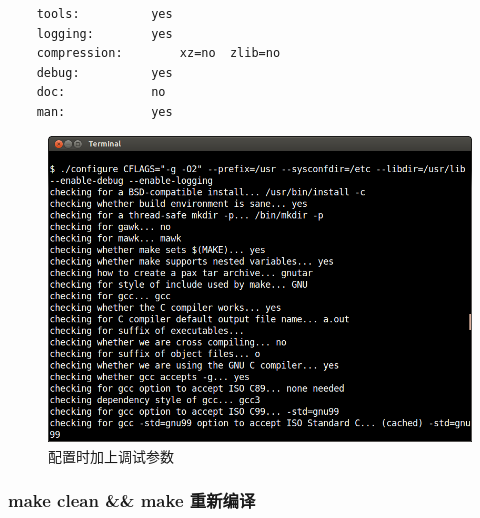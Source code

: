 \documentclass[11pt,a4paper]{article}
\makeatletter
\def\maxwidth{\ifdim\Gin@nat@width>\linewidth\linewidth
\else\Gin@nat@width\fi}
\let\Oldincludegraphics\includegraphics
\renewcommand{\includegraphics}[1]{\Oldincludegraphics[width=\maxwidth]{#1}}
\makeatother
\begin{document}
{\begin{shaded}
\begin{verbatim}
    tools:          yes
    logging:        yes
    compression:        xz=no  zlib=no
    debug:          yes
    doc:            no
    man:            yes
\end{verbatim}\end{shaded}}
\begin{figure}[htbp]
\centering
\includegraphics{./pictures/2-1-configure.png}
\caption{配置时加上调试参数}
\end{figure}

\subsubsection{make clean \&\& make 重新编译}
\end{document}
